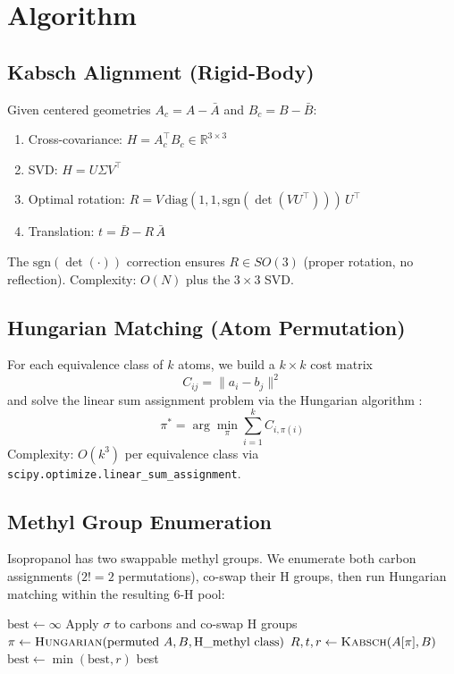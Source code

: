 \documentclass[11pt]{article}
\begin{document}
\section{Algorithm}

\subsection{Kabsch Alignment (Rigid-Body)}

Given centered geometries $A_c = A - \bar{A}$ and $B_c = B - \bar{B}$:

\begin{enumerate}
  \item Cross-covariance: $H = A_c^\top B_c \in \mathbb{R}^{3 \times 3}$
  \item SVD: $H = U \Sigma V^\top$
  \item Optimal rotation: $R = V \, \text{diag}(1, 1, \text{sgn}(\det(V U^\top))) \, U^\top$
  \item Translation: $t = \bar{B} - R\,\bar{A}$
\end{enumerate}

\noindent The $\text{sgn}(\det(\cdot))$ correction ensures $R \in SO(3)$ (proper rotation, no reflection). Complexity: $O(N)$ plus the $3 \times 3$ SVD.

\subsection{Hungarian Matching (Atom Permutation)}

For each equivalence class of $k$ atoms, we build a $k \times k$ cost matrix
\[
  C_{ij} = \|a_i - b_j\|^2
\]
and solve the linear sum assignment problem via the Hungarian algorithm \cite{kuhn1955hungarian}:
\[
  \pi^* = \arg\min_{\pi} \sum_{i=1}^{k} C_{i,\pi(i)}
\]
Complexity: $O(k^3)$ per equivalence class via \texttt{scipy.optimize.linear\_sum\_assignment}.

\subsection{Methyl Group Enumeration}

Isopropanol has two swappable methyl groups. We enumerate both carbon assignments ($2! = 2$ permutations), co-swap their H groups, then run Hungarian matching within the resulting 6-H pool:

\begin{algorithm}[H]
\caption{Aligned RMSD for Isopropanol}
\begin{algorithmic}[1]
\STATE $\text{best} \gets \infty$
  \STATE Apply $\sigma$ to carbons and co-swap H groups
  \STATE $\pi \gets \textsc{Hungarian}(\text{permuted } A, B, \text{H\_methyl class})$
  \STATE $R, t, r \gets \textsc{Kabsch}(A[\pi], B)$
  \STATE $\text{best} \gets \min(\text{best}, r)$
\ENDFOR
\RETURN best
\end{algorithmic}
\end{algorithm}
\end{document}
